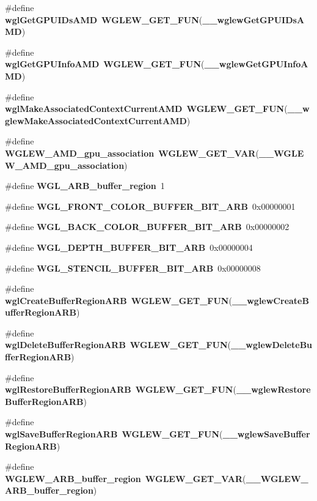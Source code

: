 \begin{DoxyCompactItemize}
\item 
\#define {\bf wgl\+Get\+G\+P\+U\+I\+Ds\+A\+MD}~{\bf W\+G\+L\+E\+W\+\_\+\+G\+E\+T\+\_\+\+F\+UN}({\bf \+\_\+\+\_\+wglew\+Get\+G\+P\+U\+I\+Ds\+A\+MD})
\item 
\#define {\bf wgl\+Get\+G\+P\+U\+Info\+A\+MD}~{\bf W\+G\+L\+E\+W\+\_\+\+G\+E\+T\+\_\+\+F\+UN}({\bf \+\_\+\+\_\+wglew\+Get\+G\+P\+U\+Info\+A\+MD})
\item 
\#define {\bf wgl\+Make\+Associated\+Context\+Current\+A\+MD}~{\bf W\+G\+L\+E\+W\+\_\+\+G\+E\+T\+\_\+\+F\+UN}({\bf \+\_\+\+\_\+wglew\+Make\+Associated\+Context\+Current\+A\+MD})
\item 
\#define {\bf W\+G\+L\+E\+W\+\_\+\+A\+M\+D\+\_\+gpu\+\_\+association}~{\bf W\+G\+L\+E\+W\+\_\+\+G\+E\+T\+\_\+\+V\+AR}({\bf \+\_\+\+\_\+\+W\+G\+L\+E\+W\+\_\+\+A\+M\+D\+\_\+gpu\+\_\+association})
\item 
\#define {\bf W\+G\+L\+\_\+\+A\+R\+B\+\_\+buffer\+\_\+region}~1
\item 
\#define {\bf W\+G\+L\+\_\+\+F\+R\+O\+N\+T\+\_\+\+C\+O\+L\+O\+R\+\_\+\+B\+U\+F\+F\+E\+R\+\_\+\+B\+I\+T\+\_\+\+A\+RB}~0x00000001
\item 
\#define {\bf W\+G\+L\+\_\+\+B\+A\+C\+K\+\_\+\+C\+O\+L\+O\+R\+\_\+\+B\+U\+F\+F\+E\+R\+\_\+\+B\+I\+T\+\_\+\+A\+RB}~0x00000002
\item 
\#define {\bf W\+G\+L\+\_\+\+D\+E\+P\+T\+H\+\_\+\+B\+U\+F\+F\+E\+R\+\_\+\+B\+I\+T\+\_\+\+A\+RB}~0x00000004
\item 
\#define {\bf W\+G\+L\+\_\+\+S\+T\+E\+N\+C\+I\+L\+\_\+\+B\+U\+F\+F\+E\+R\+\_\+\+B\+I\+T\+\_\+\+A\+RB}~0x00000008
\item 
\#define {\bf wgl\+Create\+Buffer\+Region\+A\+RB}~{\bf W\+G\+L\+E\+W\+\_\+\+G\+E\+T\+\_\+\+F\+UN}({\bf \+\_\+\+\_\+wglew\+Create\+Buffer\+Region\+A\+RB})
\item 
\#define {\bf wgl\+Delete\+Buffer\+Region\+A\+RB}~{\bf W\+G\+L\+E\+W\+\_\+\+G\+E\+T\+\_\+\+F\+UN}({\bf \+\_\+\+\_\+wglew\+Delete\+Buffer\+Region\+A\+RB})
\item 
\#define {\bf wgl\+Restore\+Buffer\+Region\+A\+RB}~{\bf W\+G\+L\+E\+W\+\_\+\+G\+E\+T\+\_\+\+F\+UN}({\bf \+\_\+\+\_\+wglew\+Restore\+Buffer\+Region\+A\+RB})
\item 
\#define {\bf wgl\+Save\+Buffer\+Region\+A\+RB}~{\bf W\+G\+L\+E\+W\+\_\+\+G\+E\+T\+\_\+\+F\+UN}({\bf \+\_\+\+\_\+wglew\+Save\+Buffer\+Region\+A\+RB})
\item 
\#define {\bf W\+G\+L\+E\+W\+\_\+\+A\+R\+B\+\_\+buffer\+\_\+region}~{\bf W\+G\+L\+E\+W\+\_\+\+G\+E\+T\+\_\+\+V\+AR}({\bf \+\_\+\+\_\+\+W\+G\+L\+E\+W\+\_\+\+A\+R\+B\+\_\+buffer\+\_\+region})

\end{DoxyCompactItemize}
